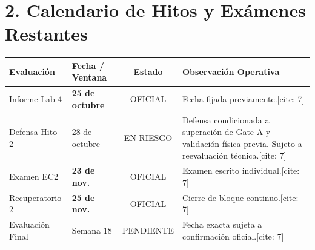 \documentclass[10pt, a4paper]{article}
\begin{document}
\section*{2. Calendario de Hitos y Exámenes Restantes}
\begin{table}[htbp]
    \centering
    \small
    \renewcommand{\arraystretch}{1.4}
    \begin{tabularx}{\textwidth}{|l|l|c|Y|}
    \hline
    \textbf{Evaluación} & \textbf{Fecha / Ventana} & \textbf{Estado} & \textbf{Observación Operativa} \\ \hline
    Informe Lab 4 & \textbf{25 de octubre} & OFICIAL & Fecha fijada previamente.[cite: 7] \\ \hline
    Defensa Hito 2 & 28 de octubre & EN RIESGO & Defensa condicionada a superación de Gate A y validación física previa. Sujeto a reevaluación técnica.[cite: 7] \\ \hline
    Examen EC2 & \textbf{23 de nov.} & OFICIAL & Examen escrito individual.[cite: 7] \\ \hline
    Recuperatorio 2 & \textbf{25 de nov.} & OFICIAL & Cierre de bloque continuo.[cite: 7] \\ \hline
    Evaluación Final & Semana 18 & PENDIENTE & Fecha exacta sujeta a confirmación oficial.[cite: 7] \\ \hline
    \end{tabularx}
\end{table}
\end{document}
